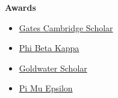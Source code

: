 \documentclass[letterpaper,11pt]{article}
\makeatletter
\newcommand{\resitem}[1]{\item #1 \vspace{-1pt}}
\newcommand{\resheading}[1]{{\large \colorbox{mygrey}{\begin{minipage}{\textwidth}{\textbf{#1 \vphantom{p\^{E}}}}\end{minipage}}}}
\newcommand{\ressubheading}[4]{
\begin{tabular*}{6.5in}{l@{\extracolsep{\fill}}r}
		\textbf{#1} & #2 \\
		\textit{#3} & \textit{#4} \\
\end{tabular*}\vspace{-6pt}}
\makeatother
\begin{document}
\resheading{\Large{Awards}}
\begin{multicols}{2}
	\begin{itemize}
	\normalsize
		\resitem{\href{http://www.gatescambridge.org/our-scholars/Profile.aspx?ScholarID=5646}{Gates Cambridge Scholar}}
		\resitem{\href{http://www.pbk.org/home/index.aspx}{Phi Beta Kappa}}
		\resitem{\href{http://www.act.org/goldwater/}{Goldwater Scholar}}
		\resitem{\href{http://www.pme-math.org/}{Pi Mu Epsilon}}

	\end{itemize}
\end{multicols}

%
%
%			
%	
%
%				
%
%								
\end{document}
